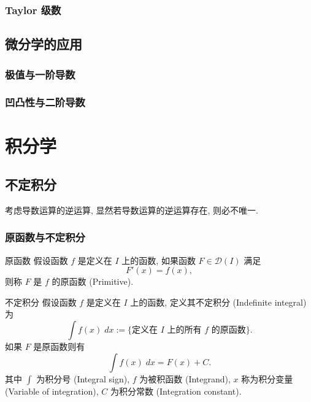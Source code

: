 \documentclass[cn,toc=twocol]{elegantbook}
\newcommand{\D}{\mathscr{D}}
\begin{document}
\subsection{Taylor 级数}

\section{微分学的应用}

\subsection{极值与一阶导数}

\subsection{凹凸性与二阶导数}


\chapter{积分学}

\section{不定积分}

考虑导数运算的逆运算, 显然若导数运算的逆运算存在, 则必不唯一.

\subsection{原函数与不定积分}

\begin{definition}{原函数}
	假设函数 $f$ 是定义在 $I$ 上的函数, 如果函数 $F\in\D(I)$ 满足
	\[
		F'(x) = f(x),
	\]
	则称 $F$ 是 $f$ 的原函数 (Primitive). 
\end{definition}

\begin{definition}{不定积分}
	假设函数 $f$	是定义在 $I$ 上的函数, 定义其不定积分 (Indefinite integral) 为
	\[
		\int f(x) \; dx := \{\text{定义在 $I$ 上的所有 $f$ 的原函数}\}.
	\]
	如果 $F$ 是原函数则有
	\[
		\int f(x) \; dx = F(x) + C.
	\]
	其中 $\int$ 为积分号 (Integral sign), $f$ 为被积函数 (Integrand), $x$ 称为积分变量 (Variable of integration), $C$ 为积分常数 (Integration constant).
\end{definition}
\end{document}
